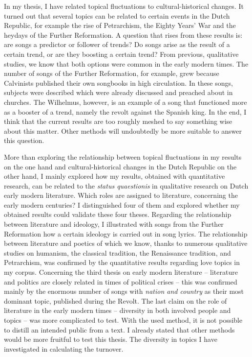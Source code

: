 In my thesis, I have related topical fluctuations to cultural-historical changes. It turned out that several topics can be related to certain events in the Dutch Republic, for example the rise of Petrarchism, the Eighty Years' War and the heydays of the Further Reformation. A question that rises from these results is: are songs a predictor or follower of trends? Do songs arise as the result of a certain trend, or are they boosting a certain trend? From previous, qualitative studies, we know that both options were common in the early modern times. The number of songs of the Further Reformation, for example, grew because Calvinists published their own songbooks in high circulation. In these songs, subjects were described which were already discussed and preached about in churches. The Wilhelmus, however, is an example of a song that functioned more as a booster of a trend, namely the revolt against the Spanish king. In the end, I think that the current results are too roughly meshed to say something wise about this matter. Other methods will undoubtedly be more suitable to answer this question.

More than exploring the relationship between topical fluctuations in my results on the one hand and cultural-historical changes in the Dutch Republic on the other hand, I mainly explored how my results, obtained with quantitative research, can be related to the \textit{status quaestionis} in qualitative research on Dutch early modern literature. Which roles are assigned to literature, concerning the early modern centuries? I distinguished four of them and explored whether my obtained results could validate these four theses. Regarding the relationship between literature and ideology, I illustrated with songs from the Further Reformation how a certain ideology is carried out in song lyrics. The relationship between literature and poetics of which we know, thanks to numerous qualitative studies on humanism, the classical tradition, the Renaissance tradition, and Petrarchism, was confirmed by the quantitative results regarding love topics in my corpus. Concerning the third thesis on early modern literature -- literature and politics are closely related in times of political crises -- this was confirmed mainly by the enormous number of songs with \textit{nation and country} as their most dominant topic, published during the Revolt. The last claim on the role of literature in the early modern times -- diversity in both involved people and topics -- was more complicated to test. With the used method, it is not possible to distill an intended public from a text. I already stated that other methods would be more fruitful to test this thesis. The diversity in topics I have investigated in calculating the turnover.

